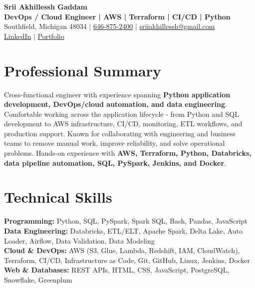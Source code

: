 \documentclass[letterpaper,10pt]{article}
\begin{document}
\fontsize{9.35pt}{10.45pt}\selectfont

\begin{center}
    {\LARGE \textbf{Srii Akhillessh Gaddam}} \\[-1pt]
    \textbf{DevOps / Cloud Engineer | AWS | Terraform | CI/CD | Python} \\[2pt]
    Southfield, Michigan 48034 $|$
    \href{tel:6468752400}{646-875-2400} $|$
    \href{mailto:sriiakhillessh@gmail.com}{sriiakhillessh@gmail.com} \\[1pt]
    \href{https://www.linkedin.com/in/srii-akhiilessh-gaddam-b48668191/}{LinkedIn} $|$
    \href{https://sriiakhillesshg.github.io/portfolio/}{Portfolio}
\end{center}
\vspace{-8pt}

\section{Professional Summary}
\small{Cross-functional engineer with experience spanning \textbf{Python application development, DevOps/cloud automation, and data engineering}. Comfortable working across the application lifecycle - from Python and SQL development to AWS infrastructure, CI/CD, monitoring, ETL workflows, and production support. Known for collaborating with engineering and business teams to remove manual work, improve reliability, and solve operational problems. Hands-on experience with \textbf{AWS, Terraform, Python, Databricks, data pipeline automation, SQL, PySpark, Jenkins, and Docker}.}

\section{Technical Skills}
\small{
\textbf{Programming:} Python, SQL, PySpark, Spark SQL, Bash, Pandas, JavaScript \\
\textbf{Data Engineering:} Databricks, ETL/ELT, Apache Spark, Delta Lake, Auto Loader, Airflow, Data Validation, Data Modeling \\
\textbf{Cloud \& DevOps:} AWS (S3, Glue, Lambda, Redshift, IAM, CloudWatch), Terraform, CI/CD, Infrastructure as Code, Git, GitHub, Linux, Jenkins, Docker \\
\textbf{Web \& Databases:} REST APIs, HTML, CSS, JavaScript, PostgreSQL, Snowflake, Greenplum
}
\end{document}
